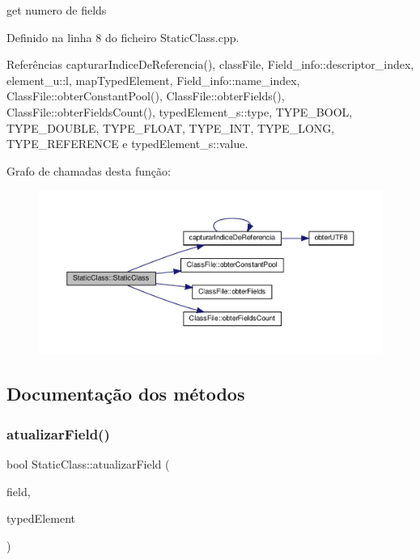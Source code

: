 get numero de fields 

Definido na linha 8 do ficheiro Static\+Class.\+cpp.



Referências capturar\+Indice\+De\+Referencia(), class\+File, Field\+\_\+info\+::descriptor\+\_\+index, element\+\_\+u\+::l, map\+Typed\+Element, Field\+\_\+info\+::name\+\_\+index, Class\+File\+::obter\+Constant\+Pool(), Class\+File\+::obter\+Fields(), Class\+File\+::obter\+Fields\+Count(), typed\+Element\+\_\+s\+::type, T\+Y\+P\+E\+\_\+\+B\+O\+OL, T\+Y\+P\+E\+\_\+\+D\+O\+U\+B\+LE, T\+Y\+P\+E\+\_\+\+F\+L\+O\+AT, T\+Y\+P\+E\+\_\+\+I\+NT, T\+Y\+P\+E\+\_\+\+L\+O\+NG, T\+Y\+P\+E\+\_\+\+R\+E\+F\+E\+R\+E\+N\+CE e typed\+Element\+\_\+s\+::value.

Grafo de chamadas desta função\+:
\nopagebreak
\begin{figure}[H]
\begin{center}
\leavevmode
\includegraphics[width=350pt]{classStaticClass_a6c0e4d8842888a97160f1e815c8e6ac3_cgraph}
\end{center}
\end{figure}


\subsection{Documentação dos métodos}
\mbox{\label{classStaticClass_aa0d9a3db46155bf6971476a22c4f2eaa}} 
\subsubsection{\texorpdfstring{atualizar\+Field()}{atualizarField()}}
{\footnotesize\ttfamily bool Static\+Class\+::atualizar\+Field (\begin{DoxyParamCaption}\item[{string}]{field,  }\item[{\hyperlink{BasicTypes_8h_a97b332303b1262282599e6ede0637b82}{Typed\+Element}}]{typed\+Element }\end{DoxyParamCaption})}



